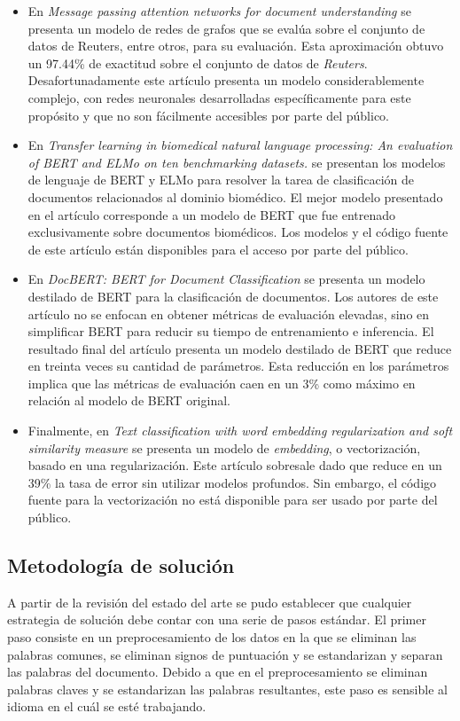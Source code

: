 \begin{itemize}
    \item En \textit{Message passing attention networks for document understanding} \cite{DC_REUTERS} se presenta un modelo de redes de grafos que se evalúa sobre el conjunto de datos de Reuters, entre otros, para su evaluación. Esta aproximación obtuvo un 97.44\% de exactitud sobre el conjunto de datos de \textit{Reuters}. Desafortunadamente este artículo presenta un modelo considerablemente complejo, con redes neuronales desarrolladas específicamente para este propósito y que no son fácilmente accesibles por parte del público. 
    \item En \textit{Transfer learning in biomedical natural language processing: An evaluation of BERT and ELMo on ten benchmarking datasets.} \cite{DC_BERT_ELMO} se presentan los modelos de lenguaje de BERT y ELMo para resolver la tarea de clasificación de documentos relacionados al dominio biomédico. El mejor modelo presentado en el artículo corresponde a un modelo de BERT que fue entrenado exclusivamente sobre documentos biomédicos. Los modelos y el código fuente de este artículo están disponibles para el acceso por parte del público.
    \item En \textit{DocBERT: BERT for Document Classification} \cite{DC_DOCBERT} se presenta un modelo destilado de BERT para la clasificación de documentos. Los autores de este artículo no se enfocan en obtener métricas de evaluación elevadas, sino en simplificar BERT para reducir su tiempo de entrenamiento e inferencia. El resultado final del artículo presenta un modelo destilado de BERT que reduce en treinta veces su cantidad de parámetros. Esta reducción en los parámetros implica que las métricas de evaluación caen en un 3\% como máximo en relación al modelo de BERT original.
    \item Finalmente, en \textit{Text classification with word embedding regularization and soft similarity measure} \cite{DC_REG_EMBEDDING} se presenta un modelo de \textit{embedding}, o vectorización, basado en una regularización. Este artículo sobresale dado que reduce en un 39\% la tasa de error sin utilizar modelos profundos. Sin embargo, el código fuente para la vectorización no está disponible para ser usado por parte del público. 
\end{itemize}

\subsection{Metodología de solución}
A partir de la revisión del estado del arte se pudo establecer que cualquier estrategia de solución debe contar con una serie de pasos estándar. El primer paso consiste en un preprocesamiento de los datos en la que se eliminan las palabras comunes, se eliminan signos de puntuación y se estandarizan y separan las palabras del documento. Debido a que en el preprocesamiento se eliminan palabras claves y se estandarizan las palabras resultantes, este paso es sensible al idioma en el cuál se esté trabajando. \\ 

